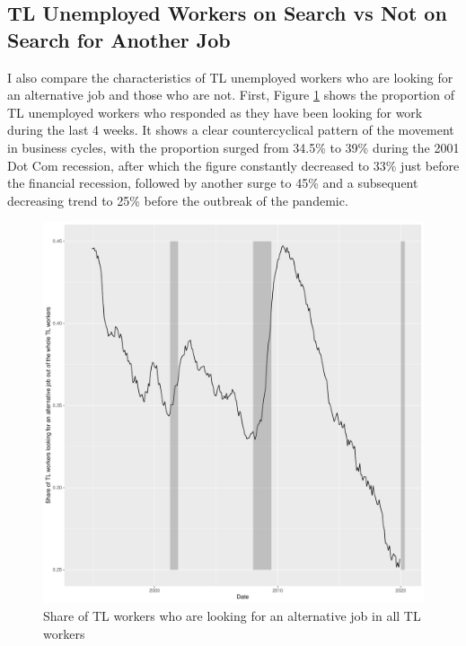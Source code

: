 \documentclass[a4paper, 11pt, tikz]{article}
\begin{document}
\subsection{TL Unemployed Workers on Search vs Not on Search for Another Job}
I also compare the characteristics of TL unemployed workers who are looking for an alternative job and those who are not.
First, Figure \ref{search_TL_share} shows the proportion of TL unemployed workers who responded as they have been looking for work during the last 4 weeks.
It shows a clear countercyclical pattern of the movement in business cycles, with the proportion surged from 34.5\% to 39\% during the 2001 Dot Com recession, after which the figure constantly decreased to 33\% just before the financial recession, followed by another surge to 45\% and a subsequent decreasing trend to 25\% before the outbreak of the pandemic.
\begin{figure}
  \centering
  \includegraphics[width=150mm]{search_TL_share.pdf}
  \caption{Share of TL workers who are looking for an alternative job in all TL workers}
  \label{search_TL_share}
\end{figure}
\end{document}
